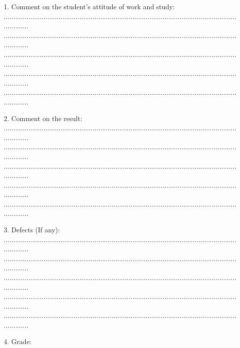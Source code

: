 \documentclass[12pt,a4paper]{report}
\begin{document}
\begin{enumerate}
	\item[1.] Comment on the student’s attitude of work and study:\\
	........................................................................................................................................\\........................................................................................................................................\\........................................................................................................................................\\........................................................................................................................................\\........................................................................................................................................
	\item[2.] Comment on the result:\\
	........................................................................................................................................\\........................................................................................................................................\\........................................................................................................................................\\........................................................................................................................................\\........................................................................................................................................
	\item[3.] Defects (If any):\\
	........................................................................................................................................\\........................................................................................................................................\\........................................................................................................................................\\........................................................................................................................................\\........................................................................................................................................
	\item[4.] Grade:\\
	
\end{enumerate}
\end{document}
